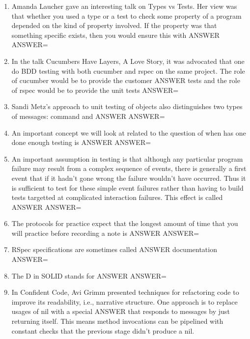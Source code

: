 \documentclass{exam}
\begin{document}
\begin{enumerate}
\item Amanda Laucher gave an interesting talk on Types vs Tests.  Her view was that whether you used a type or a test to check some property of a program depended on the kind of property involved.  If the property was that something specific exists, then you would ensure this with ANSWER\newline
ANSWER=
\item In the talk Cucumbers Have Layers, A Love Story, it was advocated that one do BDD testing with both cucumber and rspec on the same project.  The role of cucumber would be to provide the customer ANSWER tests and the role of rspec would be to provide the unit tests\newline
ANSWER=
\item Sandi Metz's approach to unit testing of objects also distinguishes two types of messages: command and ANSWER\newline
ANSWER=
\item An important concept we will look at related to the question of when has one done enough testing is ANSWER\newline
ANSWER=
\item An important assumption in testing is that although any particular program failure may result from a complex sequence of events, there is generally a first event that if it hadn't gone wrong the failure wouldn't have occurred.  Thus it is sufficient to test for these simple event failures rather than having to build tests targetted at complicated interaction failures.  This effect is called ANSWER \newline
ANSWER=
\item The protocols for practice expect that the longest amount of time that you will practice before recording a note is ANSWER\newline
ANSWER=
\item RSpec specifications are sometimes called ANSWER documentation\newline
ANSWER=
\item The D in SOLID stands for ANSWER\newline
ANSWER=
\item In Confident Code, Avi Grimm presented techniques for refactoring code to improve its readability, i.e., narrative structure.  One approach is to replace usages of nil with a special ANSWER that responds to messages by just returning itself.  This means method invocations can be pipelined with constant checks that the previous stage didn't produce a nil.\newline

\end{enumerate}
\end{document}
